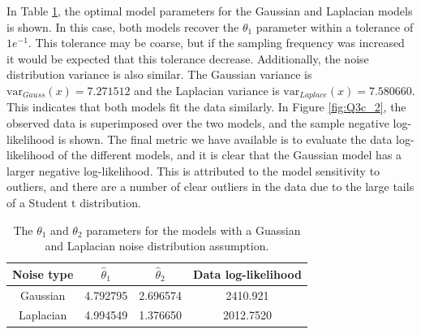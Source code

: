 \documentclass{article}
\begin{document}
In Table \ref{tab:Q3b_table2}, the optimal model parameters for the Gaussian and Laplacian models is shown. In this case, both models recover the $\theta_1$ parameter within a tolerance of $1e^{-1}$. This tolerance may be coarse, but if the sampling frequency was increased it would be expected that this tolerance decrease. Additionally, the noise distribution variance is also similar. The Gaussian variance is $\text{var}_{Gauss}(x) = 7.271512$ and the Laplacian variance is $\text{var}_{Laplace}(x) = 7.580660$. This indicates that both models fit the data similarly. In Figure \ref{fig:Q3c_2}, the observed data is superimposed over the two models, and the sample negative log-likelihood is shown. The final metric we have available is to evaluate the data log-likelihood of the different models, and it is clear that the Gaussian model has a larger negative log-likelihood. This is attributed to the model sensitivity to outliers, and there are a number of clear outliers in the data due to the large tails of a Student t distribution.
\begin{table}[!htb]
\centering
\caption{The $\theta_1$ and $\theta_2$ parameters for the models with a Guassian and Laplacian noise distribution assumption.}
\label{tab:Q3b_table2}
\begin{tabular}{@{}cccc@{}}
\toprule
Noise type & $\hat{\theta}_1$ & $\hat{\theta}_2$ & Data log-likelihood \\ \midrule
Gaussian & 4.792795 & 2.696574 & 2410.921 \\
Laplacian & 4.994549 & 1.376650 & 2012.7520 \\ \bottomrule
\end{tabular}
\end{table}
\end{document}
